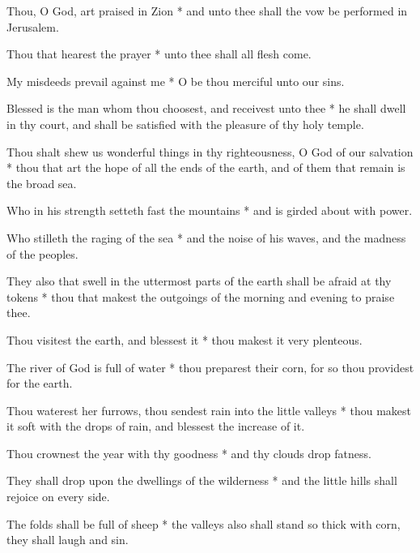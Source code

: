 Thou, O God, art praised in Zion * and unto thee shall the vow be performed in Jerusalem.

Thou that hearest the prayer * unto thee shall all flesh come.

My misdeeds prevail against me * O be thou merciful unto our sins.

Blessed is the man whom thou choosest, and receivest unto thee * he shall dwell in thy court, and shall be satisfied with the pleasure of thy holy temple.

Thou shalt shew us wonderful things in thy righteousness, O God of our salvation * thou that art the hope of all the ends of the earth, and of them that remain is the broad sea.

Who in his strength setteth fast the mountains * and is girded about with power.

Who stilleth the raging of the sea * and the noise of his waves, and the madness of the peoples.

They also that swell in the uttermost parts of the earth shall be afraid at thy tokens * thou that makest the outgoings of the morning and evening to praise thee.

Thou visitest the earth, and blessest it * thou makest it very plenteous.

The river of God is full of water * thou preparest their corn, for so thou providest for the earth.

Thou waterest her furrows, thou sendest rain into the little valleys * thou makest it soft with the drops of rain, and blessest the increase of it.

Thou crownest the year with thy goodness * and thy clouds drop fatness.

They shall drop upon the dwellings of the wilderness * and the little hills shall rejoice on every side.

The folds shall be full of sheep * the valleys also shall stand so thick with corn, they shall laugh and sin.